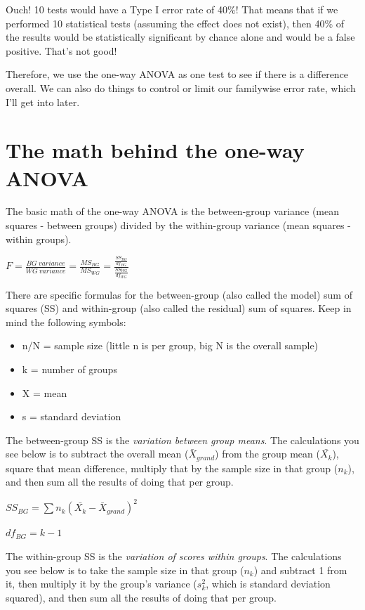 \documentclass[
]{book}
\providecommand{\tightlist}{%
  \setlength{\itemsep}{0pt}\setlength{\parskip}{0pt}}
\begin{document}
Ouch! 10 tests would have a Type I error rate of 40\%! That means that if we performed 10 statistical tests (assuming the effect does not exist), then 40\% of the results would be statistically significant by chance alone and would be a false positive. That's not good!

Therefore, we use the one-way ANOVA as one test to see if there is a difference overall. We can also do things to control or limit our familywise error rate, which I'll get into later.

\hypertarget{the-math-behind-the-one-way-anova}{%
\section{The math behind the one-way ANOVA}\label{the-math-behind-the-one-way-anova}}

The basic math of the one-way ANOVA is the between-group variance (mean squares - between groups) divided by the within-group variance (mean squares - within groups).

\(F = \frac{BG \:variance}{WG \:variance} = \frac{MS_{BG}}{MS_{WG}} = \frac{\frac{SS_{BG}}{df_{BG}}}{\frac{SS_{WG}}{df_{WG}}}\)

There are specific formulas for the between-group (also called the model) sum of squares (SS) and within-group (also called the residual) sum of squares. Keep in mind the following symbols:

\begin{itemize}
\tightlist
\item
  n/N = sample size (little n is per group, big N is the overall sample)
\item
  k = number of groups
\item
  X = mean
\item
  s = standard deviation
\end{itemize}

The between-group SS is the \emph{variation between group means}. The calculations you see below is to subtract the overall mean (\(\bar{X}_{grand}\)) from the group mean (\(\bar{X_k}\)), square that mean difference, multiply that by the sample size in that group (\(n_k\)), and then sum all the results of doing that per group.

\(SS_{BG} = \sum{n_k}(\bar{X_k}-\bar{X}_{grand})^2\)

\(df_{BG} = k - 1\)

The within-group SS is the \emph{variation of scores within groups}. The calculations you see below is to take the sample size in that group (\(n_k\)) and subtract 1 from it, then multiply it by the group's variance (\(s_k^2\), which is standard deviation squared), and then sum all the results of doing that per group.
\end{document}
